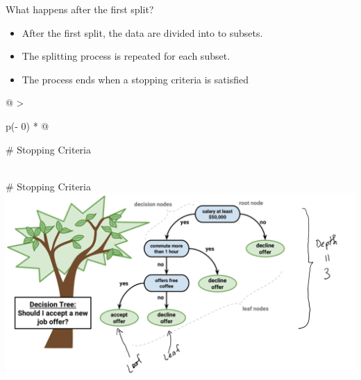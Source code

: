\documentclass[
  ignorenonframetext,
]{beamer}
\providecommand{\tightlist}{%
  \setlength{\itemsep}{0pt}\setlength{\parskip}{0pt}}
\begin{document}
\begin{frame}{What happens after the first split?}
\protect\hypertarget{what-happens-after-the-first-split}{}
\begin{itemize}
\tightlist
\item
  After the first split, the data are divided into to subsets.
\item
  The splitting process is repeated for each subset.
\item
  The process ends when a stopping criteria is satisfied
\end{itemize}

\begin{longtable}[]{@{}
  >{\raggedright\arraybackslash}p{(\columnwidth - 0\tabcolsep) * }@{}}
\toprule
\begin{minipage}[b]{\linewidth}\raggedright
\# Stopping Criteria
\end{minipage} \\
\midrule
\endhead
\# Stopping Criteria \\
\includegraphics{images/tree6.png} \\
\bottomrule
\end{longtable}
\end{frame}
\end{document}
